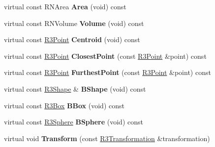 \begin{DoxyCompactItemize}
\item 
virtual const R\+N\+Area {\bfseries Area} (void) const \hypertarget{class_r3_shape_adcd2aaa1a693e19bfca921fcc6d7a0b3}{}\label{class_r3_shape_adcd2aaa1a693e19bfca921fcc6d7a0b3}

\item 
virtual const R\+N\+Volume {\bfseries Volume} (void) const \hypertarget{class_r3_shape_a5a37c10a86d7a9820b3b5196d6a10462}{}\label{class_r3_shape_a5a37c10a86d7a9820b3b5196d6a10462}

\item 
virtual const \hyperlink{class_r3_point}{R3\+Point} {\bfseries Centroid} (void) const \hypertarget{class_r3_shape_a4c6ade5aa398118b7466f4d84e6826da}{}\label{class_r3_shape_a4c6ade5aa398118b7466f4d84e6826da}

\item 
virtual const \hyperlink{class_r3_point}{R3\+Point} {\bfseries Closest\+Point} (const \hyperlink{class_r3_point}{R3\+Point} \&point) const \hypertarget{class_r3_shape_a3f05de0550568443376095d7c837bf3b}{}\label{class_r3_shape_a3f05de0550568443376095d7c837bf3b}

\item 
virtual const \hyperlink{class_r3_point}{R3\+Point} {\bfseries Furthest\+Point} (const \hyperlink{class_r3_point}{R3\+Point} \&point) const \hypertarget{class_r3_shape_a41794b2d44a1c56c5cf73be83cb4165e}{}\label{class_r3_shape_a41794b2d44a1c56c5cf73be83cb4165e}

\item 
virtual const \hyperlink{class_r3_shape}{R3\+Shape} \& {\bfseries B\+Shape} (void) const \hypertarget{class_r3_shape_a0435c98d5c9fe998dcd58e49d75321b2}{}\label{class_r3_shape_a0435c98d5c9fe998dcd58e49d75321b2}

\item 
virtual const \hyperlink{class_r3_box}{R3\+Box} {\bfseries B\+Box} (void) const \hypertarget{class_r3_shape_a4b94120517811e7b20ffb636303c58b7}{}\label{class_r3_shape_a4b94120517811e7b20ffb636303c58b7}

\item 
virtual const \hyperlink{class_r3_sphere}{R3\+Sphere} {\bfseries B\+Sphere} (void) const \hypertarget{class_r3_shape_afb605cbb61b4920d6b243542f73bbc4c}{}\label{class_r3_shape_afb605cbb61b4920d6b243542f73bbc4c}

\item 
virtual void {\bfseries Transform} (const \hyperlink{class_r3_transformation}{R3\+Transformation} \&transformation)\hypertarget{class_r3_shape_a805967275158cebf6ba63469dfeacf6b}{}\label{class_r3_shape_a805967275158cebf6ba63469dfeacf6b}


\end{DoxyCompactItemize}
